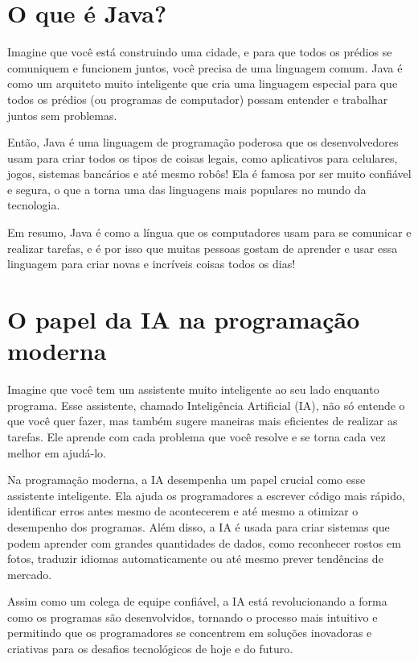 \documentclass[a4paper,12pt]{book}
\begin{document}
\section{O que é Java?}

Imagine que você está construindo uma cidade, e para que todos os prédios se comuniquem e funcionem juntos, você precisa de uma linguagem comum. Java é como um arquiteto muito inteligente que cria uma linguagem especial para que todos os prédios (ou programas de computador) possam entender e trabalhar juntos sem problemas.

Então, Java é uma linguagem de programação poderosa que os desenvolvedores usam para criar todos os tipos de coisas legais, como aplicativos para celulares, jogos, sistemas bancários e até mesmo robôs! Ela é famosa por ser muito confiável e segura, o que a torna uma das linguagens mais populares no mundo da tecnologia.

Em resumo, Java é como a língua que os computadores usam para se comunicar e realizar tarefas, e é por isso que muitas pessoas gostam de aprender e usar essa linguagem para criar novas e incríveis coisas todos os dias!

\section{O papel da IA na programação moderna}

Imagine que você tem um assistente muito inteligente ao seu lado enquanto programa. Esse assistente, chamado Inteligência Artificial (IA), não só entende o que você quer fazer, mas também sugere maneiras mais eficientes de realizar as tarefas. Ele aprende com cada problema que você resolve e se torna cada vez melhor em ajudá-lo.

Na programação moderna, a IA desempenha um papel crucial como esse assistente inteligente. Ela ajuda os programadores a escrever código mais rápido, identificar erros antes mesmo de acontecerem e até mesmo a otimizar o desempenho dos programas. Além disso, a IA é usada para criar sistemas que podem aprender com grandes quantidades de dados, como reconhecer rostos em fotos, traduzir idiomas automaticamente ou até mesmo prever tendências de mercado.

Assim como um colega de equipe confiável, a IA está revolucionando a forma como os programas são desenvolvidos, tornando o processo mais intuitivo e permitindo que os programadores se concentrem em soluções inovadoras e criativas para os desafios tecnológicos de hoje e do futuro.
\end{document}
